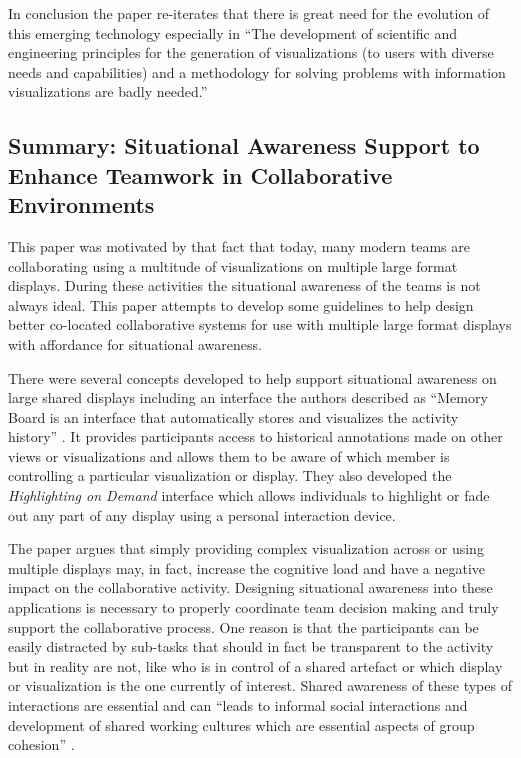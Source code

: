 \documentclass{sig-alternate}
\begin{document}
 
In conclusion the paper re-iterates that there is great need for the evolution
of this emerging technology especially in ``The development of scientific and
engineering principles for the generation of visualizations  (to users with
diverse needs and capabilities) and a methodology for solving problems with
information visualizations are badly needed.'' \cite{Gershon:1998:Informationvisualization}

\subsection{Summary: Situational Awareness Support to Enhance Teamwork in
Collaborative Environments \cite{Kulyk:2008:SituationalAwareness}} This paper
was motivated by that fact that today, many modern teams are collaborating using
a multitude of visualizations on multiple large format displays. During these
activities the situational awareness of the teams is not always ideal. This
paper attempts to develop some guidelines to help design better co-located
collaborative systems for use with multiple large format displays with
affordance for situational awareness.
 
 
There were several concepts developed to help support situational awareness on
large shared displays including an interface the authors described as ``Memory
Board is an interface that automatically stores and visualizes the activity
history'' \cite{Kulyk:2008:SituationalAwareness}. It provides participants access to historical annotations
made on other views or visualizations and allows them to be aware of which member is
controlling a particular visualization or display. They also developed the
\emph{Highlighting on Demand} interface which allows individuals to highlight or
fade out any part of any display using a personal interaction device.
 
 
The paper argues that simply providing complex visualization across or using
multiple displays may, in fact, increase the cognitive load and have a negative
impact on the collaborative activity. Designing situational awareness into these
applications is necessary to properly coordinate team decision making and truly
support the collaborative process. One reason is that the participants can be
easily distracted by sub-tasks that should in fact be transparent to the
activity but in reality are not, like who is in control of a shared artefact or
which display or visualization is the one currently of interest. Shared
awareness of these types of interactions are essential and can ``leads to
informal social interactions and development of shared working cultures which
are essential aspects of group cohesion''
\cite{Kulyk:2008:SituationalAwareness}.
 
\end{document}
